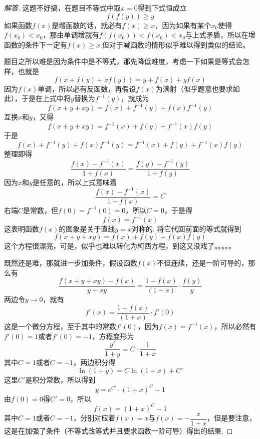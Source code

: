 \begin{proof}[解答]
这题不好搞，在题目不等式中取$x=0$得到下式恒成立
\[ f(f(y)) \geqslant y \]
如果函数$f(x)$是增函数的话，就必有$f(x) \geqslant x$，因为如果有某个$x_0$使得$f(x_0)<x_0$，那由单调增就有$f(f(x_0))<f(x_0)<x_0$与上式矛盾，所以在增函数的条件下一定有$f(x) \geqslant x$.但对于减函数的情形似乎难以得到类似的结论。

题目之所以难是因为条件中是不等式，那先降低难度，考虑一下如果是等式会怎样，也就是
\[ f(x+f(y)+xf(y)) = y+f(x)+yf(x) \]
因为$f(x)$单调，所以必有反函数，再假设$f(x)$为满射（似乎题意也要求如此），于是在上式中将$y$替换为$f^{-1}(y)$，就成为
\[ f(x+y+xy)=f(x)+f^{-1}(y)+f(x)f^{-1}(y) \]
互换$x$和$y$，又得
\[ f(x+y+xy)=f^{-1}(x)+f(y)+f^{-1}(x)f(y) \]
于是
\[ f(x)+f^{-1}(y)+f(x)f^{-1}(y) = f^{-1}(x)+f(y)+f^{-1}(x)f(y) \]
整理即得
\[ \frac{f(x)-f^{-1}(x)}{1+f(x)}=\frac{f(y)-f^{-1}(y)}{1+f(y)} \] 
因为$x$和$y$是任意的，所以上式意味着
\[  \frac{f(x)-f^{-1}(x)}{1+f(x)}=C \]
右端$C$是常数，但$f(0)=f^{-1}(0)=0$，所以$C=0$，于是得
\[ f(x)=f^{-1}(x) \]
这表明函数$f(x)$的图象是关于直线$y=x$对称的. 将它代回前面的等式就得到
\[ f(x+y+xy)=f(x)+f(y)+f(x)f(y) \]
这个方程很漂亮，可是，似乎也难以转化为柯西方程，到这又没戏了。。。。。

既然还是难，那就进一步加条件，假设函数$f(x)$不但连续，还是一阶可导的，那么有
\[ \frac{f(x+y+xy)-f(x)}{y+xy} = \frac{1+f(x)}{(1+x)} \cdot \frac{f(y)}{y} \]
两边令$y \to 0$，就有
\[ f'(x) =  \frac{1+f(x)}{(1+x)}  \cdot f'(0) \]
这是一个微分方程，至于其中的常数$f'(0)$，因为$f(x)=f^{-1}(x)$，所以必然有$f'(0)=1$或者$f'(0)=-1$，方程变形为
\[ \frac{y'}{1+y} = C \cdot \frac{1}{1+x} \]
其中$C=1$或者$C=-1$，两边积分得
\[ \ln{(1+y)} = C \ln{(1+x)}+C' \]
这里$C'$是积分常数，所以得到
\[ y= e^{C'} \cdot (1+x)^C - 1 \]
由$f(0)=0$得$C'=0$，所以
\[ f(x)=(1+x)^C-1 \]
其中$C=1$或者$C=-1$，分别对应着$f(x)=x$与$f(x)=-\dfrac{x}{1+x}$，但是要注意，这是在加强了条件（不等式改等式并且要求函数一阶可导）得出的结果.
\end{proof}

